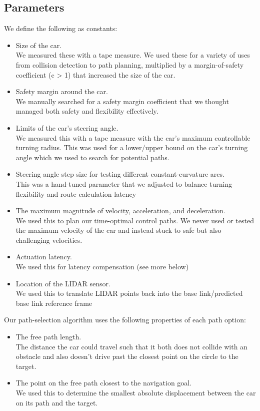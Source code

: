 \documentclass[11pt]{article}
\begin{document}
\subsection{Parameters}

We define the following as constants:
\begin{itemize}
    \item Size of the car.
    \\ We measured these with a tape measure. We used these for a variety of uses from collision detection to path planning, multiplied by a margin-of-safety coefficient (c > 1) that increased the size of the car.
    \item Safety margin around the car.
    \\ We manually searched for a safety margin  coefficient that we thought managed both safety and flexibility effectively.  
    \item Limits of the car's steering angle.
    \\ We measured this with a tape measure with the car's maximum controllable turning radius. This was used for a lower/upper bound on the car's turning angle which we used to search for potential paths. 
    \item Steering angle step size for testing different constant-curvature arcs.
    \\ This was a hand-tuned parameter that we adjusted to balance turning flexibility and route calculation latency
    \item The maximum magnitude of velocity, acceleration, and deceleration.
    \\ We used this to plan our time-optimal control paths. We never used or tested the maximum velocity of the car and instead stuck to safe but also challenging velocities.  
    \item Actuation latency.
    \\ We used this for latency compensation (see more below)
    \item Location of the LIDAR sensor.
    \\ We used this to translate LIDAR points back into the base link/predicted base link reference frame
\end{itemize}

Our path-selection algorithm uses the following properties of each path option:
\begin{itemize}
    \item The free path length.
    \\The distance the car could travel such that it both does not collide with an obstacle and also doesn't drive past the closest point on the circle to the target. 
    \item The point on the free path closest to the navigation goal.
    \\We used this to determine the smallest absolute displacement between the car on its path and the target.
\end{itemize}
\end{document}
